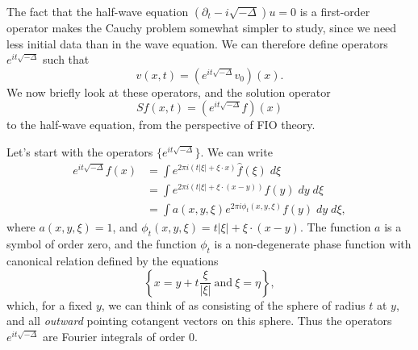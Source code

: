 \documentclass{article}
\theoremstyle{plain}
\theoremstyle{remark}
\theoremstyle{definition}
\begin{document}
The fact that the half-wave equation $(\partial_t - i \sqrt{-\Delta}) u = 0$ is a first-order operator makes the Cauchy problem somewhat simpler to study, since we need less initial data than in the wave equation. We can therefore define operators $e^{it \sqrt{-\Delta}}$ such that
%
\[ v(x,t) = (e^{i t \sqrt{-\Delta}} v_0)(x). \]
%
We now briefly look at these operators, and the solution operator
%
\[ Sf(x,t) = (e^{i t \sqrt{-\Delta}} f)(x) \]
%
to the half-wave equation, from the perspective of FIO theory.

\begin{comment}

Fourier transform of e^{-|x|} is

	c_d (1 + |xi|^2)^{- (d+1) / 2}

Fourier transform of e^{- lambda |x|} for lambda > 0 is

	int e^{- lambda |x|} e^{-i xi * x} dx
	= c_d lambda^{-d} (1 + |xi|^2 / lambda^2)^{-(d+1)/2}

Can we now apply analytic continuation to conclude that
the Fourier transform of e^{-it |x|} is equal to

	c_d (it)^{-d} ( 1 + |xi|^2 / (it + 0)^2 )^{-(d+1)/2}

where we take the branch of the square root that is the analytic extension
away of the normal square root away, defined away from the imaginary axis.

Then for |xi| > t this quantity is equal to

	c_d i t^{-d} ( |xi|^2 / t^2 - 1 )^{-(d+1)/2}

e^{-i pi / 2}

sqrt( a e^{it} ) = sqrt(a) sqrt(e^{it/2})

\end{comment}

Let's start with the operators $\{ e^{it \sqrt{-\Delta}} \}$. We can write
%
\begin{align*}
	e^{i t \sqrt{-\Delta}} f(x) &= \int e^{2 \pi i (t |\xi| + \xi \cdot x)} \widehat{f}(\xi)\; d\xi\\
	&= \int e^{2 \pi i (t |\xi| + \xi \cdot (x - y))} f(y)\; dy\; d\xi\\
	&= \int a(x,y,\xi) e^{2 \pi i \phi_t(x,y,\xi)} f(y)\; dy\; d\xi,
\end{align*}
%
where $a(x,y,\xi) = 1$, and $\phi_t(x,y,\xi) = t |\xi| + \xi \cdot (x - y)$. The function $a$ is a symbol of order zero, and the function $\phi_t$ is a non-degenerate phase function with canonical relation defined by the equations
%
\[ \left\{ x = y + t \frac{\xi}{|\xi|}\ \text{and}\ \xi = \eta \right\}, \]
%
which, for a fixed $y$, we can think of as consisting of the sphere of radius $t$ at $y$, and all \emph{outward} pointing cotangent vectors on this sphere. Thus the operators $e^{it \sqrt{-\Delta}}$ are Fourier integrals of order $0$.
\end{document}
